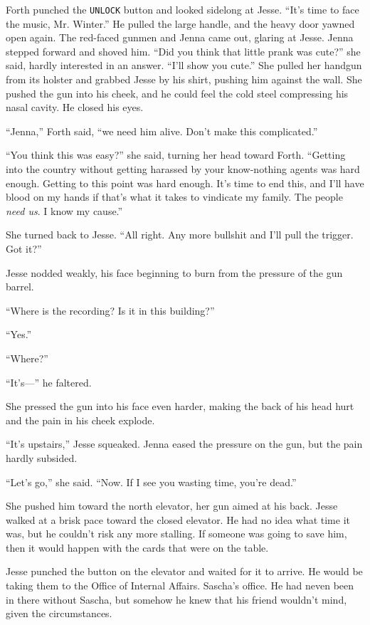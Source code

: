 \documentclass[12pt]{book}
\begin{document}
Forth punched the \texttt{UNLOCK} button and looked sidelong at Jesse.  ``It's time to face the music, Mr. Winter.''  He pulled the large handle, and the heavy door yawned open again.  The red-faced gunmen and Jenna came out, glaring at Jesse.  Jenna stepped forward and shoved him.  ``Did you think that little prank was cute?'' she said, hardly interested in an answer.  ``I'll show you cute.''  She pulled her handgun from its holster and grabbed Jesse by his shirt, pushing him against the wall.  She pushed the gun into his cheek, and he could feel the cold steel compressing his nasal cavity.  He closed his eyes.

``Jenna,'' Forth said, ``we need him alive.  Don't make this complicated.''

``You think this was easy?'' she said, turning her head toward Forth.  ``Getting into the country without getting harassed by your know-nothing agents was hard enough.  Getting to this point was hard enough.  It's time to end this, and I'll have blood on my hands if that's what it takes to vindicate my family.  The people \emph{need us}.  I know my cause.''

She turned back to Jesse.  ``All right.  Any more bullshit and I'll pull the trigger.  Got it?''

Jesse nodded weakly, his face beginning to burn from the pressure of the gun barrel.

``Where is the recording?  Is it in this building?''

``Yes.''

``Where?''

``It's---'' he faltered.

She pressed the gun into his face even harder, making the back of his head hurt and the pain in his cheek explode.

``It's upstairs,'' Jesse squeaked.  Jenna eased the pressure on the gun, but the pain hardly subsided.

``Let's go,'' she said.  ``Now.  If I see you wasting time, you're dead.''

She pushed him toward the north elevator, her gun aimed at his back.  Jesse walked at a brisk pace toward the closed elevator.  He had no idea what time it was, but he couldn't risk any more stalling.  If someone was going to save him, then it would happen with the cards that were on the table.

Jesse punched the button on the elevator and waited for it to arrive.  He would be taking them to the Office of Internal Affairs.  Sascha's office.  He had neven been in there without Sascha, but somehow he knew that his friend wouldn't mind, given the circumstances.
\end{document}
